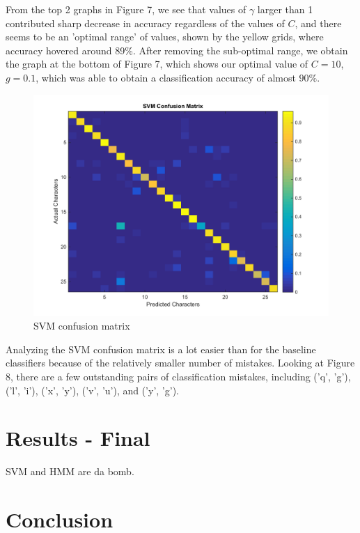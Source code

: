 \documentclass{article} %
\begin{document}
From the top 2 graphs in Figure 7, we see that values of $\gamma$ larger than 1 contributed sharp decrease in accuracy regardless of the values of $C$, and there seems to be an 'optimal range' of values, shown by the yellow grids, where accuracy hovered around 89\%. After removing the sub-optimal range, we obtain the graph at the bottom of Figure 7, which shows our optimal value of $C=10$, $g=0.1$, which was able to obtain a classification accuracy of almost $90\%$.

\begin{figure}[h]
\begin{center}
\includegraphics[scale=0.4]{confusion_svm.png}
\end{center}
\caption{SVM confusion matrix}
\end{figure}

Analyzing the SVM confusion matrix is a lot easier than for the baseline classifiers because of the relatively smaller number of mistakes. Looking at Figure 8, there are a few outstanding pairs of classification mistakes, including ('q', 'g'), ('l', 'i'), ('x', 'y'), ('v', 'u'), and ('y', 'g').

\section{Results - Final}

SVM and HMM are da bomb.

\section{Conclusion}
\end{document}
